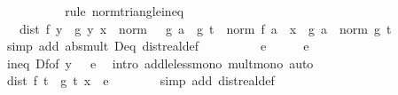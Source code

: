 \begin{isabellebody}
\ \ \ \ \ \ \isamarkupfalse%
\ {\isacharasterisk}{\kern0pt}\ \isamarkupfalse%
\ {\isacharparenleft}{\kern0pt}rule\ norm{\isacharunderscore}{\kern0pt}triangle{\isacharunderscore}{\kern0pt}ineq{\isacharparenright}{\kern0pt}\isanewline
\ \ \ \ \isamarkupfalse%
\ \isamarkupfalse%
\ {\isachardoublequoteopen}{\isasymdots}\ {\isacharequal}{\kern0pt}\ dist\ {\isacharparenleft}{\kern0pt}f{\isacharprime}{\kern0pt}\ y\ {\isacharslash}{\kern0pt}\ g{\isacharprime}{\kern0pt}\ y{\isacharparenright}{\kern0pt}\ x\ {\isacharasterisk}{\kern0pt}\ norm\ {\isacharparenleft}{\kern0pt}{}\ {\isacharminus}{\kern0pt}\ g\ a\ {\isacharslash}{\kern0pt}\ g\ t{\isacharparenright}{\kern0pt}\ {\isacharplus}{\kern0pt}\ norm\ {\isacharparenleft}{\kern0pt}f\ a\ {\isacharminus}{\kern0pt}\ x\ {\isacharasterisk}{\kern0pt}\ g\ a{\isacharparenright}{\kern0pt}\ {\isacharslash}{\kern0pt}\ norm\ {\isacharparenleft}{\kern0pt}g\ t{\isacharparenright}{\kern0pt}{\isachardoublequoteclose}\isanewline
\ \ \ \ \ \ \isamarkupfalse%
\ {\isacharparenleft}{\kern0pt}simp\ add{\isacharcolon}{\kern0pt}\ abs{\isacharunderscore}{\kern0pt}mult\ D{\isacharunderscore}{\kern0pt}eq\ dist{\isacharunderscore}{\kern0pt}real{\isacharunderscore}{\kern0pt}def{\isacharparenright}{\kern0pt}\isanewline
\ \ \ \ \isamarkupfalse%
\ \isamarkupfalse%
\ {\isachardoublequoteopen}{\isasymdots}\ {\isacharless}{\kern0pt}\ {\isacharparenleft}{\kern0pt}e\ {\isacharslash}{\kern0pt}\ {}{\isacharparenright}{\kern0pt}\ {\isacharasterisk}{\kern0pt}\ {}\ {\isacharplus}{\kern0pt}\ e\ {\isacharslash}{\kern0pt}\ {}{\isachardoublequoteclose}\isanewline
\ \ \ \ \ \ \isamarkupfalse%
\ ineq\ Df{\isacharbrackleft}{\kern0pt}of\ y{\isacharbrackright}{\kern0pt}\ {\isacartoucheopen}{}\ {\isacharless}{\kern0pt}\ e{\isacartoucheclose}\ \isamarkupfalse%
\ {\isacharparenleft}{\kern0pt}intro\ add{\isacharunderscore}{\kern0pt}le{\isacharunderscore}{\kern0pt}less{\isacharunderscore}{\kern0pt}mono\ mult{\isacharunderscore}{\kern0pt}mono{\isacharparenright}{\kern0pt}\ auto\isanewline
\ \ \ \ \isamarkupfalse%
\ \isamarkupfalse%
\ {\isachardoublequoteopen}dist\ {\isacharparenleft}{\kern0pt}f\ t\ {\isacharslash}{\kern0pt}\ g\ t{\isacharparenright}{\kern0pt}\ x\ {\isacharless}{\kern0pt}\ e{\isachardoublequoteclose}\isanewline
\ \ \ \ \ \ \isamarkupfalse%
\ {\isacharparenleft}{\kern0pt}simp\ add{\isacharcolon}{\kern0pt}\ dist{\isacharunderscore}{\kern0pt}real{\isacharunderscore}{\kern0pt}def{\isacharparenright}{\kern0pt}\isanewline

\end{isabellebody}
